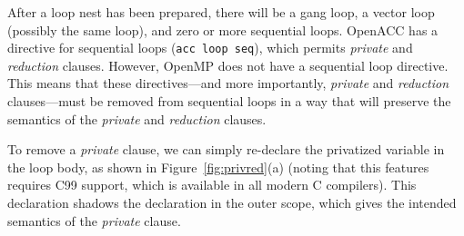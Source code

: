 \documentclass{sig-alternate-05-2015}
\begin{document}

After a loop nest has been prepared, there will be a gang loop, a vector loop
(possibly the same loop), and zero or more sequential loops.  OpenACC has a
directive for sequential loops (\texttt{acc loop seq}), which permits
\emph{private} and \emph{reduction} clauses.  However, OpenMP does not have a
sequential loop directive.  This means that these directives---and more
importantly, \emph{private} and \emph{reduction} clauses---must be removed from
sequential loops in a way that will preserve the semantics of the
\emph{private} and \emph{reduction} clauses.

To remove a \emph{private} clause, we can simply re-declare the privatized
variable in the loop body, as shown in Figure~\ref{fig:privred}(a) (noting that
this features requires C99 support, which is available in all modern C
compilers).  This declaration shadows the declaration in the outer scope,
which gives the intended semantics of the \emph{private} clause.
\end{document}
